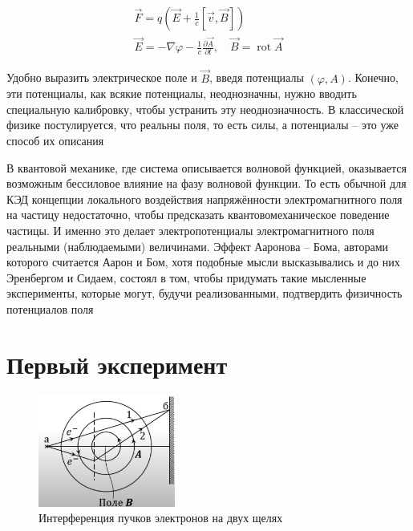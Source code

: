 \documentclass[a4paper, 14pt]{article}
\begin{document}
    \begin{gather}
        \vec{F} = q\left( \vec{E} + \frac{1}{c} [\vec{v}, \vec{B}] \right) \\
        \vec{E} = -\nabla \varphi - \frac{1}{c} \frac{\partial \vec{A}}{\partial t}, \quad \vec{B} =
        \operatorname{rot} \vec{A}
    \end{gather}
    
    Удобно выразить электрическое поле и $\vec{B}$, введя потенциалы $(\varphi, A)$.
    Конечно, эти потенциалы, как всякие потенциалы, неоднозначны, нужно вводить специальную калибровку, чтобы
    устранить эту неоднозначность.
    В классической физике постулируется, что реальны поля, то есть силы, а потенциалы -- это уже способ их описания
    
    В квантовой механике, где система описывается волновой функцией, оказывается возможным бессиловое влияние на
    фазу волновой функции.
    То есть обычной для КЭД концепции локального воздействия напряжённости электромагнитного поля на частицу
    недостаточно, чтобы предсказать квантовомеханическое поведение частицы.
    И именно это делает электропотенциалы электромагнитного поля реальными (наблюдаемыми) величинами.
    Эффект Ааронова -- Бома, авторами которого считается Аарон и Бом, хотя подобные мысли высказывались и до них
    Эренбергом и Сидаем, состоял в том, чтобы придумать такие мысленные эксперименты, которые могут, будучи
    реализованными, подтвердить физичность потенциалов поля
    
    \section*{Первый эксперимент} 
    
    \begin{figure}[h]
        \centering
        \includegraphics[width=0.4\textwidth]{exp1}
        \caption{Интерференция пучков электронов на двух щелях}
        \label{fig:exp1}
    \end{figure}
    
\end{document}

